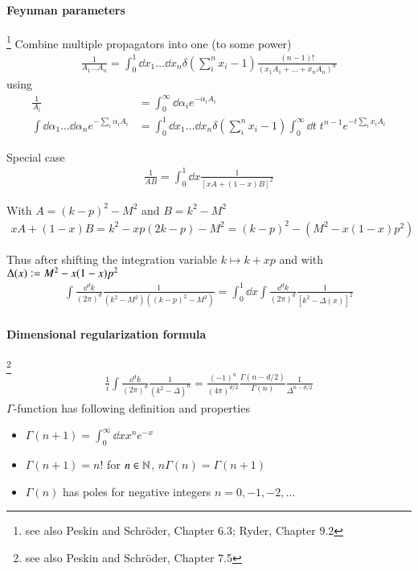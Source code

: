 \paragraph{Feynman parameters}\footnote{see also Peskin and Schröder, Chapter 6.3; Ryder, Chapter 9.2} Combine multiple propagators into one (to some power)
\begin{align}
	\frac{1}{A_1 \dots A_n} = \int^1_0 \dd x_1 \dots \dd x_n \delta(\sum_i^n x_i - 1) \frac{(n-1)!}{(x_1 A_1 + \dots + x_n A_n)^n}
\end{align}
using 
\begin{align*}
	\frac{1}{A_i} &= \int^\infty_0 \dd \alpha_i e^{-\alpha_i A_i} \\
	\int \dd \alpha_1 \dots \dd \alpha_n e^{-\sum_i \alpha_i A_i} &= \int^1_0 \dd x_1 \dots \dd x_n \delta \left(\sum^n_i x_i - 1\right) \int^\infty_0 \dd t\; t^{n-1} e^{-t\sum_i x_i A_i}
\end{align*}

Special case
\begin{align}
	\frac{1}{AB} = \int^1_0 \dd x \frac{1}{ \left[ xA + (1-x)B \right]^2  }
\end{align}

With $A = (k-p)^2 - M^2$ and $B=k^2-M^2$
 \begin{align*}
	xA+(1-x)B = k^2 - xp(2k-p) - M^2 = (k-p)^2 - (M^2 -x(1-x)p^2)
\end{align*}

Thus after shifting the integration variable $k \longmapsto k+xp$ and with $\Delta(x) \vcentcolon = M^2 - x(1-x)p^2$
\begin{align*}
	\int \frac{\dd^d k}{(2\pi)^d} \frac{1}{(k^2-M^2)((k-p)^2-M^2)} = \int^1_0 \dd x \int \frac{\dd^d k}{(2\pi)^d} \frac{1}{[k^2 - \Delta(x)]^2}
\end{align*}

\paragraph{Dimensional regularization formula}\footnote{see also Peskin and Schröder, Chapter 7.5}
\begin{align}
	\frac{1}{i} \int \frac{\dd^d k}{(2\pi)^d} \frac{1}{(k^2 - \Delta)^n} = \frac{(-1)^n}{(4\pi)^{d/2}} \frac{\Gamma(n-d/2)}{\Gamma(n)} \frac{1}{\Delta^{n-d/2}}
\end{align}
$\Gamma$-function has following definition and properties
\begin{itemize}
	\item $\Gamma(n+1) = \int^\infty_0 \dd x x^n e^{-x}$
	\item $\Gamma(n+1) = n!$ for $n \in \mathbb{N}$, $n\Gamma(n) = \Gamma(n+1)$
	\item $\Gamma(n)$ has poles for negative integers $n=0, -1, -2, \dots$
\end{itemize}

